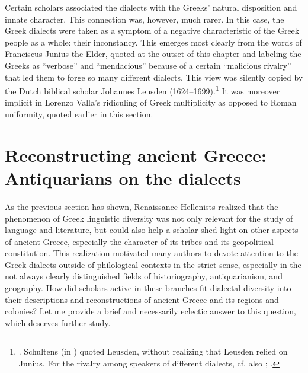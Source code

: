 Certain scholars associated the dialects with the Greeks’ natural disposition and innate character. This connection was, however, much rarer. In this case, the Greek dialects were taken as a symptom of a negative characteristic of the Greek people as a whole: their inconstancy. This emerges most clearly from the words of Franciscus Junius the Elder, quoted at the outset of this chapter and labeling the Greeks as “verbose” and “mendacious” because of a certain “malicious rivalry” that led them to forge so many different dialects. This view was silently copied by the Dutch biblical scholar Johannes Leusden (1624–1699).\footnote{\citet[a.4\textsc{\textsuperscript{r}}\textsc{–}a.4\textsc{\textsuperscript{v}}, 167]{Leusden1656}. Schultens (in \citet[§\textsc{xlix.}δ]{Eskhult_albert_nodate}) quoted Leusden, without realizing that Leusden relied on Junius. For the rivalry among speakers of different dialects, cf. also \citet[5\textsc{\textsuperscript{r}}]{Baile1588}; \citet[\textsc{b.3}\textsc{\textsuperscript{r}}]{Schorling1678}.} It was moreover implicit in Lorenzo Valla’s ridiculing of Greek multiplicity as opposed to Roman uniformity, quoted earlier in this section.

\section{Reconstructing ancient Greece: Antiquarians on the dialects}\label{sec:7.6}


As the previous section has shown, Renaissance Hellenists realized that the phenomenon of Greek linguistic diversity was not only relevant for the study of language and literature, but could also help a scholar shed light on other aspects of ancient Greece, especially the character of its tribes and its geopolitical constitution. This realization motivated many authors to devote attention to the Greek dialects outside of philological contexts in the strict sense, especially in the not always clearly distinguished fields of historiography, antiquarianism, and geography. How did scholars active in these branches fit dialectal diversity into their descriptions and reconstructions of ancient Greece and its regions and colonies? Let me provide a brief and necessarily eclectic answer to this question, which deserves further study.

